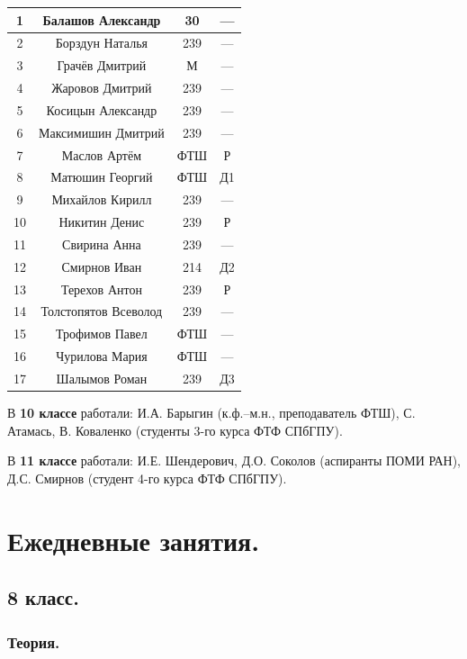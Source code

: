 \documentclass[11pt]{article}
\newlength{\h}
\newlength{\x}
\begin{document}
\begin{table}[ht]
\begin{minipage}[t]{0.45\linewidth}
\begin{tabular}[h]{|c|c|c|c|}
      \hline
      1 & Балашов Александр & 30 & ---  \\ \hline
      2 & Борздун Наталья & 239 & ---  \\ \hline
      3 & Грачёв Дмитрий & М & ---  \\ \hline
      4 & Жаровов Дмитрий & 239 & ---  \\ \hline
      5 & Косицын Александр & 239 & ---  \\ \hline
      6 & Максимишин Дмитрий & 239 & ---  \\ \hline
      7 & Маслов Артём & ФТШ & Р  \\ \hline
      8 & Матюшин Георгий & ФТШ & Д1  \\ \hline
      9 & Михайлов Кирилл & 239 & ---  \\ \hline
      10 & Никитин Денис & 239 & Р  \\ \hline
      11 & Свирина Анна & 239 & ---  \\ \hline
      12 & Смирнов Иван & 214 & Д2  \\ \hline
      13 & Терехов Антон & 239 & Р  \\ \hline
      14 & Толстопятов Всеволод & 239 & ---  \\ \hline
      15 & Трофимов Павел & ФТШ & ---  \\ \hline
      16 & Чурилова Мария & ФТШ & ---  \\ \hline
      17 & Шалымов Роман & 239 & Д3  \\ \hline
    \end{tabular}
  \end{minipage}
\end{table}

В \textbf{10 классе} работали: И.А. Барыгин (к.ф.--м.н., преподаватель
ФТШ), С. Атамась, В. Коваленко (студенты 3-го курса ФТФ СПбГПУ).

В \textbf{11 классе} работали: И.Е. Шендерович, Д.О. Соколов
(аспиранты ПОМИ РАН), Д.С. Смирнов (студент 4-го курса ФТФ СПбГПУ). 

\section{Ежедневные занятия.}
\label{sec:daily}

\subsection{8 класс.}
\label{sec:daily8}

\subsubsection{Теория.}
\label{sec:th8}
\end{document}
